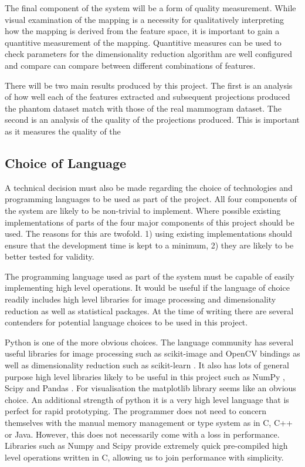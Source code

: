 The final component of the system will be a form of quality measurement. While visual examination of the mapping is a necessity for qualitatively interpreting how the mapping is derived from the feature space, it is important to gain a quantitive measurement of the mapping. Quantitive measures can be used to check parameters for the dimensionality reduction algorithm are well configured and compare can compare between different combinations of features. 

There will be two main results produced by this project. The first is an analysis of how well each of the features extracted and subsequent projections produced the phantom dataset match with those of the real mammogram dataset. The second is an analysis of the quality of the projections produced. This is important as it measures the quality of the 

\subsection{Choice of Language}
\label{sec:choice-of-language}
A technical decision must also be made regarding the choice of technologies and programming languages to be used as part of the project. All four components of the system are likely to be non-trivial to implement. Where possible existing implementations of parts of the four major components of this project should be used. The reasons for this are twofold. 1) using existing implementations should ensure that the development time is kept to a minimum, 2) they are likely to be better tested for validity. 

The programming language used as part of the system must be capable of easily implementing high level operations. It would be useful if the language of choice readily includes high level libraries for image processing and dimensionality reduction as well as statistical packages. At the time of writing there are several contenders for potential language choices to be used in this project. 

Python \cite{pythonLanguage} is one of the more obvious choices. The language community has several useful libraries for image processing such as scikit-image \cite{van2014scikit} and OpenCV bindings \cite{openCV} as well as dimensionality reduction such as scikit-learn \cite{pedregosa2011scikit}. It also has lots of general purpose high level libraries likely to be useful in this project such as NumPy \cite{pythonNumpy}, Scipy \cite{pythonSciPy} and Pandas \cite{pythonPandas}. For visualisation the matplotlib library seems like an obvious choice. An additional strength of python it is a very high level language that is perfect for rapid prototyping. The programmer does not need to concern themselves with the manual memory management or type system as in C, C++ or Java. However, this does not necessarily come with a loss in performance. Libraries such as Numpy and Scipy provide extremely quick pre-compiled high level operations written in C, allowing us to join performance with simplicity.

